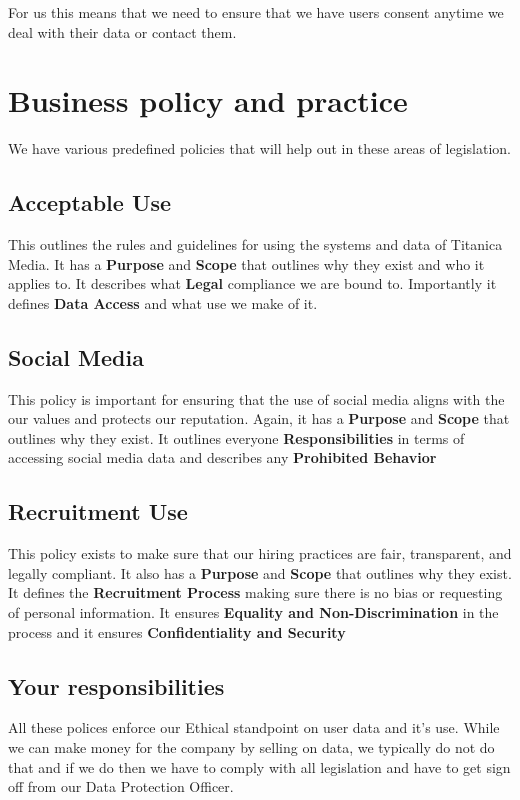 \documentclass{article}
\begin{document}
For us this means that we need to ensure that we have users consent anytime we deal with their data or contact them.

\newpage
\section{Business policy and practice}
We have various predefined policies that will help out in these areas of legislation.

\subsection{Acceptable Use}
This outlines the rules and guidelines for using the systems and data of Titanica Media.
It has a \textbf{Purpose} and \textbf{Scope} that outlines why they exist and who it applies to.
It describes what \textbf{Legal} compliance we are bound to. Importantly it defines \textbf{Data Access} and what use we make of it.

\subsection{Social Media}
This policy is important for ensuring that the use of social media aligns with the our values and protects our reputation.
Again, it has a \textbf{Purpose} and \textbf{Scope} that outlines why they exist.
It outlines everyone \textbf{Responsibilities} in terms of accessing social media data and describes any \textbf{Prohibited Behavior}

\subsection{Recruitment Use}
This policy exists to make sure that our hiring practices are fair, transparent, and legally compliant.
It also has a \textbf{Purpose} and \textbf{Scope} that outlines why they exist.
It defines the \textbf{Recruitment Process} making sure there is no bias or requesting of personal information.
It ensures \textbf{Equality and Non-Discrimination} in the process and it ensures \textbf{Confidentiality and Security}
 

\subsection{Your responsibilities}
All these polices enforce our Ethical standpoint on user data and it's use. While we can make money for the company by selling on data, we typically do not do that and if we do then we have to comply with all legislation and have to get sign off from our Data Protection Officer.
\end{document}
